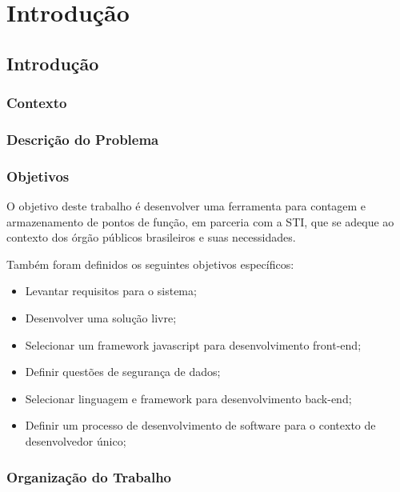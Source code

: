 \part{Introdução}

\chapter[Introdução]{Introdução}

\section{Contexto}

\section{Descrição do Problema}

\section{Objetivos}

O objetivo deste  trabalho é desenvolver uma ferramenta para contagem e
armazenamento de pontos de função, em parceria com a STI,  que se adeque ao
contexto dos órgão públicos brasileiros e suas necessidades.

Também foram definidos os seguintes objetivos específicos:

\begin{itemize}

  \item Levantar requisitos para o sistema;

  \item Desenvolver uma solução livre;

  \item Selecionar um framework javascript para desenvolvimento front-end;

  \item  Definir questões de segurança de dados;

  \item Selecionar linguagem e framework para desenvolvimento back-end;

  \item Definir um processo de desenvolvimento de software para o contexto de
  desenvolvedor único;

\end{itemize}


\section{Organização do Trabalho}

